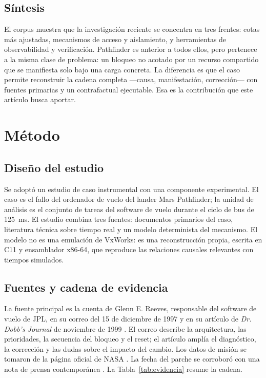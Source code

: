 \documentclass[journal]{IEEEtran}
\begin{document}
\subsection{Síntesis}

El corpus muestra que la investigación reciente se concentra en tres frentes: cotas más ajustadas, mecanismos de acceso y aislamiento, y herramientas de observabilidad y verificación. Pathfinder es anterior a todos ellos, pero pertenece a la misma clase de problema: un bloqueo no acotado por un recurso compartido que se manifiesta solo bajo una carga concreta. La diferencia es que el caso permite reconstruir la cadena completa ---causa, manifestación, corrección--- con fuentes primarias y un contrafactual ejecutable. Esa es la contribución que este artículo busca aportar.

\section{Método}
\label{sec:metodo}

\subsection{Diseño del estudio}

Se adoptó un estudio de caso instrumental con una componente experimental. El caso es el fallo del ordenador de vuelo del lander Mars Pathfinder; la unidad de análisis es el conjunto de tareas del software de vuelo durante el ciclo de bus de 125~ms. El estudio combina tres fuentes: documentos primarios del caso, literatura técnica sobre tiempo real y un modelo determinista del mecanismo. El modelo no es una emulación de VxWorks: es una reconstrucción propia, escrita en C11 y ensamblador x86-64, que reproduce las relaciones causales relevantes con tiempos simulados.

\subsection{Fuentes y cadena de evidencia}

La fuente principal es la cuenta de Glenn E. Reeves, responsable del software de vuelo de JPL, en su correo del 15 de diciembre de 1997 \cite{reeves1997mars} y en su artículo de \emph{Dr. Dobb's Journal} de noviembre de 1999 \cite{reeves1999priority}. El correo describe la arquitectura, las prioridades, la secuencia del bloqueo y el reset; el artículo amplía el diagnóstico, la corrección y las dudas sobre el impacto del cambio. Los datos de misión se tomaron de la página oficial de NASA \cite{nasa2017pathfinder}. La fecha del parche se corroboró con una nota de prensa contemporánea \cite{ap1997glitch}. La Tabla~\ref{tab:evidencia} resume la cadena.
\end{document}
